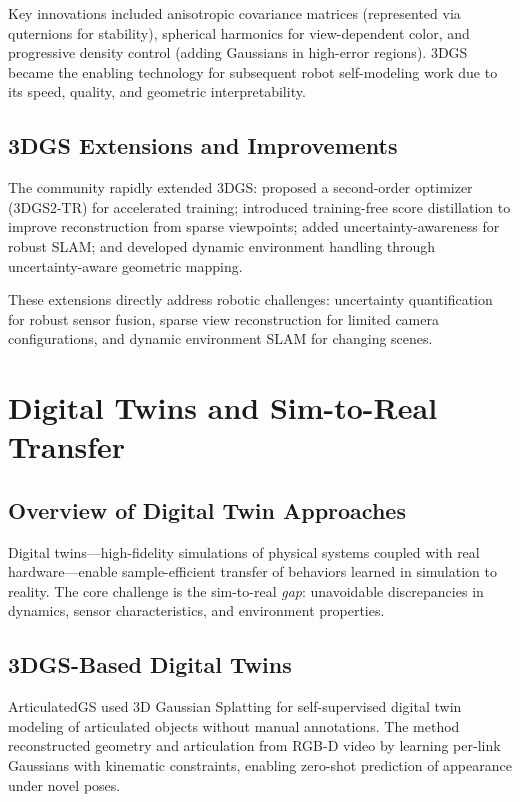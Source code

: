 \documentclass[journal]{IEEEtran}
\begin{document}
Key innovations included anisotropic covariance matrices (represented via quternions for stability), spherical harmonics for view-dependent color, and progressive density control (adding Gaussians in high-error regions). 3DGS became the enabling technology for subsequent robot self-modeling work due to its speed, quality, and geometric interpretability.

\subsection{3DGS Extensions and Improvements}

The community rapidly extended 3DGS: \cite{3dgs2tr2026} proposed a second-order optimizer (3DGS2-TR) for accelerated training; \cite{fixingsg2026} introduced training-free score distillation to improve reconstruction from sparse viewpoints; \cite{varsplat2026} added uncertainty-awareness for robust SLAM; and \cite{wildgsslam2025} developed dynamic environment handling through uncertainty-aware geometric mapping.

These extensions directly address robotic challenges: uncertainty quantification for robust sensor fusion, sparse view reconstruction for limited camera configurations, and dynamic environment SLAM for changing scenes.

\section{Digital Twins and Sim-to-Real Transfer}

\subsection{Overview of Digital Twin Approaches}

Digital twins---high-fidelity simulations of physical systems coupled with real hardware---enable sample-efficient transfer of behaviors learned in simulation to reality. The core challenge is the sim-to-real \textit{gap}: unavoidable discrepancies in dynamics, sensor characteristics, and environment properties.

\subsection{3DGS-Based Digital Twins}

ArticulatedGS \cite{articulatedgs2025} used 3D Gaussian Splatting for self-supervised digital twin modeling of articulated objects without manual annotations. The method reconstructed geometry and articulation from RGB-D video by learning per-link Gaussians with kinematic constraints, enabling zero-shot prediction of appearance under novel poses.
\end{document}
